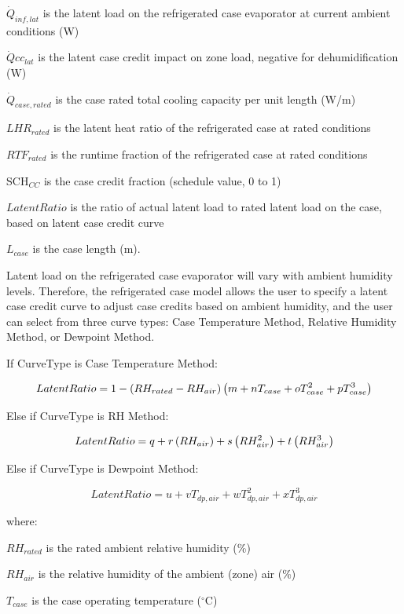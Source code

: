 \({\dot Q_{inf,lat}}\) is the latent load on the refrigerated case evaporator at current ambient conditions (W)

\(\dot Qc{c_{lat}}\) is the latent case credit impact on zone load, negative for dehumidification (W)

\({\dot Q_{case,rated}}\) is the case rated total cooling capacity per unit length (W/m)

\(LH{R_{rated}}\) is the latent heat ratio of the refrigerated case at rated conditions

\(RT{F_{rated}}\) is the runtime fraction of the refrigerated case at rated conditions

SCH\(_{CC}\) is the case credit fraction (schedule value, 0 to 1)

\(LatentRatio\) is the ratio of actual latent load to rated latent load on the case, based on latent case credit curve

\({L_{case}}\) is the case length (m).

Latent load on the refrigerated case evaporator will vary with ambient humidity levels. Therefore, the refrigerated case model allows the user to specify a latent case credit curve to adjust case credits based on ambient humidity, and the user can select from three curve types: Case Temperature Method, Relative Humidity Method, or Dewpoint Method.

If CurveType is Case Temperature Method:

\begin{equation}
  LatentRatio = 1-\left(RH_{rated}-RH_{air}\right)\left(m+nT_{case}+oT_{case}^2+pT_{case}^3\right)
\end{equation}

Else if CurveType is RH Method:

\begin{equation}
  LatentRatio = q + r\left(RH_{air}\right) + s\left(RH_{air}^2\right) + t\left(RH_{air}^3\right)
\end{equation}

Else if CurveType is Dewpoint Method:

\begin{equation}
  LatentRatio = u + vT_{dp,air} + wT_{dp,air}^2 + xT_{dp,air}^3
\end{equation}

where:

\(R{H_{rated}}\) is the rated ambient relative humidity (\%)

\(R{H_{air}}\) is the relative humidity of the ambient (zone) air (\%)

\({T_{case}}\) is the case operating temperature (\(^{\circ}\)C)

